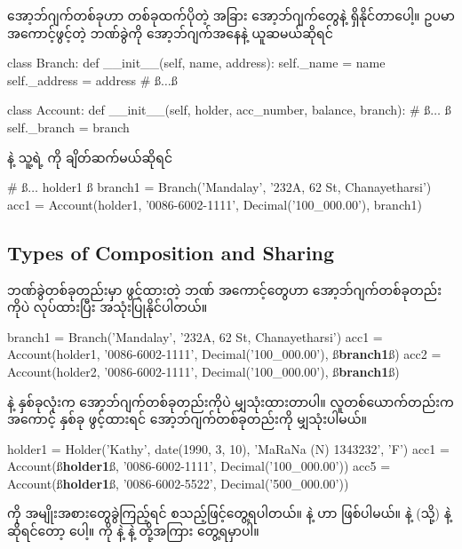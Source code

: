 အော့ဘ်ဂျက်တစ်ခုဟာ တစ်ခုထက်ပိုတဲ့ အခြား အော့ဘ်ဂျက်တွေနဲ့  ရှိနိုင်တာပေါ့။ ဥပမာ အကောင့်ဖွင့်တဲ့ ဘဏ်ခွဲကို အော့ဘ်ဂျက်အနေနဲ့ ယူဆမယ်ဆိုရင် 
%
\begin{py}
class Branch:
    def __init__(self, name, address):
        self._name = name
        self._address = address
    # ß$\ldots$ß

class Account:
    def __init__(self, holder, acc_number, balance, branch):
        # ß$\ldots$ ß
        self._branch = branch
\end{py}
%
 နဲ့ သူ့ရဲ့  ကို ချိတ်ဆက်မယ်ဆိုရင်
%
\begin{py}
# ß$\ldots$ holder1 ß
branch1 = Branch('Mandalay', '232A, 62 St, Chanayetharsi')
acc1 = Account(holder1, 
               '0086-6002-1111', 
               Decimal('100_000.00'), 
               branch1)
\end{py}
%

\subsection*{Types of Composition and Sharing}
ဘဏ်ခွဲတစ်ခုတည်းမှာ ဖွင့်ထားတဲ့ ဘဏ် အကောင့်တွေဟာ  အော့ဘ်ဂျက်တစ်ခုတည်းကိုပဲ  လုပ်ထားပြီး အသုံးပြုနိုင်ပါတယ်။
%
\begin{py}
branch1 = Branch('Mandalay', '232A, 62 St, Chanayetharsi')
acc1 = Account(holder1, 
               '0086-6002-1111', 
               Decimal('100_000.00'), 
               ß\textbf{branch1}ß)
acc2 = Account(holder2, 
               '0086-6002-1111', 
               Decimal('100_000.00'), 
               ß\textbf{branch1}ß)
\end{py}
%
 နဲ့  နှစ်ခုလုံးက  အော့ဘ်ဂျက်တစ်ခုတည်းကိုပဲ မျှသုံးထားတာပါ။ လူတစ်ယောက်\allowbreak တည်းက အကောင့် နှစ်ခု ဖွင့်ထားရင်  အော့ဘ်ဂျက်တစ်ခုတည်းကို မျှသုံးပါမယ်။

%
\begin{py}
holder1 = Holder('Kathy',
    date(1990, 3, 10),
    'MaRaNa (N) 1343232',
    'F')
acc1 = Account(ß\textbf{holder1}ß, '0086-6002-1111', Decimal('100_000.00'))
acc5 = Account(ß\textbf{holder1}ß, '0086-6002-5522', Decimal('500_000.00'))
\end{py}
%

 ကို အမျိုးအစားတွေခွဲကြည့်ရင်  စသည့်ဖြင့်တွေ့ရပါတယ်။  နဲ့  ဟာ  ဖြစ်ပါမယ်။  နဲ့  (သို့)  နဲ့  ဆိုရင်တော့  ပေါ့။  ကို  နဲ့ \fEn{,}  နဲ့  တို့အကြား တွေ့ရမှာပါ။ 

